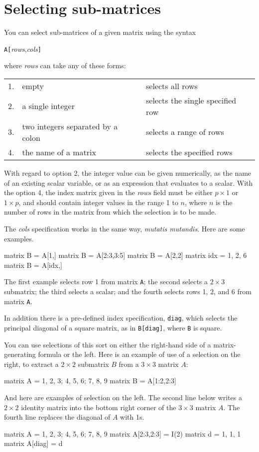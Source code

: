 \section{Selecting sub-matrices}
\label{sec:matrix-sub}

You can select sub-matrices of a given matrix using the syntax

\hspace{1em} \texttt{A[}\textsl{rows},\textsl{cols}\texttt{]}

where \textsl{rows} can take any of these forms:

\begin{center}
\begin{tabular}{lll}
1. & empty & selects all rows \\
2. & a single integer & selects the single specified row \\
3. & two integers separated by a colon & selects a range of rows \\
4. & the name of a matrix & selects the specified rows \\
\end{tabular}
\end{center}

With regard to option 2, the integer value can be given numerically,
as the name of an existing scalar variable, or as an expression that
evaluates to a scalar.  With the option 4, the index matrix given
in the \textsl{rows} field must be either $p\times 1$ or $1\times p$,
and should contain integer values in the range 1 to $n$, where $n$ is
the number of rows in the matrix from which the selection is to be
made.

The \textsl{cols} specification works in the same way, \textit{mutatis
  mutandis}.  Here are some examples.
%
\begin{code}
matrix B = A[1,]
matrix B = A[2:3,3:5]
matrix B = A[2,2]
matrix idx = { 1, 2, 6 }
matrix B = A[idx,]
\end{code}
%
The first example selects row 1 from matrix \texttt{A}; the second
selects a $2\times 3$ submatrix; the third selects a scalar; and
the fourth selects rows 1, 2, and 6 from matrix \texttt{A}.

In addition there is a pre-defined index specification, \texttt{diag},
which selects the principal diagonal of a square matrix, as in
\texttt{B[diag]}, where \texttt{B} is square.

You can use selections of this sort on either the right-hand side of
a matrix-generating formula or the left.  Here is an example of use of
a selection on the right, to extract a $2\times 2$ submatrix $B$ from a
$3\times 3$ matrix $A$:
%
\begin{code}
matrix A = { 1, 2, 3; 4, 5, 6; 7, 8, 9 }
matrix B = A[1:2,2:3]
\end{code}
%
And here are examples of selection on the left.  The second line below
writes a $2\times 2$ identity matrix into the bottom right corner of the
$3\times 3$ matrix $A$.  The fourth line replaces the diagonal of $A$ 
with 1s.
%
\begin{code}
matrix A = { 1, 2, 3; 4, 5, 6; 7, 8, 9 }
matrix A[2:3,2:3] = I(2)
matrix d = { 1, 1, 1 }
matrix A[diag] = d
\end{code}

